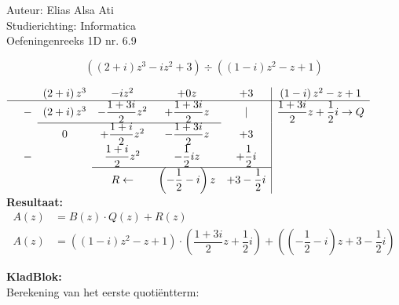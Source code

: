 \documentclass[a4paper]{article}
\begin{document}
\noindent \large Auteur: Elias Alsa Ati                         \\
\noindent \large Studierichting: Informatica                    \\
\noindent \large Oefeningenreeks 1D nr. 6.9 \small\cite{a}      \\

\medskip

\normalsize

$$\left( \left(2 + i\right)z^3 - iz^2 + 3\right) \div \left(\left(1 - i\right)z^2 - z + 1\right)$$

$\begin{array}{rccccc|c}
&   &\left(2 + i\right)z^3  &    - iz^2                     &   + 0z                                    &       + 3             &   \left(1 - i\right)z^2 - z + 1                       \\  \cline{1-7}
& - &\left(2 + i\right)z^3  &    - \dfrac{1 + 3i}{2} z^2    &   + \dfrac{1 + 3i}{2} z                   &        |              &    \dfrac{1+3i}{2}z + \dfrac{1}{2}i \rightarrow Q     \\  \cline{3-5}
&   &          0            &    +  \dfrac{1+i}{2}z^2       &   - \dfrac{1 + 3i}{2}z                    &       + 3             &                                                       \\
& - &                       &       \dfrac{1+i}{2}z^2       &   - \dfrac{1}{2}iz                        &       +\dfrac{1}{2}i  &                                                       \\  \cline{4-6} 
&   &                       &          R \leftarrow         &    \left(-\dfrac{1}{2} -i\right)z         &   + 3 - \dfrac{1}{2}i &
\end{array}$ \\

\textbf{Resultaat:}\\

\begin{align*}
    A(z) &= B(z) \cdot Q(z) + R(z) \\
    A(z) &= \left(\left(1 - i\right)z^2 - z + 1\right) \cdot \left(\dfrac{1+3i}{2}z + \dfrac{1}{2}i\right) + \left(\left(-\dfrac{1}{2}-i\right)z + 3 -\dfrac{1}{2}i\right)
\end{align*}

\textbf{KladBlok:}  \\

Berekening van het eerste quotiëntterm:\\
\end{document}
